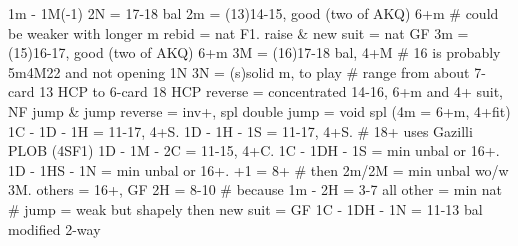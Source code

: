 1m - 1M(-1)
2N = 17-18 bal
2m = (13)14-15, good (two of AKQ) 6+m  # could be weaker with longer m
    rebid = nat F1. raise & new suit = nat GF
3m = (15)16-17, good (two of AKQ) 6+m
3M = (16)17-18 bal, 4+M  # 16 is probably 5m4M22 and not opening 1N
3N = (s)solid m, to play  # range from about 7-card 13 HCP to 6-card 18 HCP
reverse = concentrated 14-16, 6+m and 4+ suit, NF
jump & jump reverse = inv+, spl
double jump = void spl (4m = 6+m, 4+fit)
1C - 1D - 1H = 11-17, 4+S. 1D - 1H - 1S = 11-17, 4+S.  # 18+ uses Gazilli
    PLOB (4SF1)
1D - 1M - 2C = 11-15, 4+C.
1C - 1DH - 1S = min unbal or 16+. 1D - 1HS - 1N = min unbal or 16+.
    +1 = 8+  # then 2m/2M = min unbal wo/w 3M. others = 16+, GF
    2H = 8-10  # because 1m - 2H = 3-7
    all other = min nat  # jump = weak but shapely
        then new suit = GF
1C - 1DH - 1N = 11-13 bal
    modified 2-way